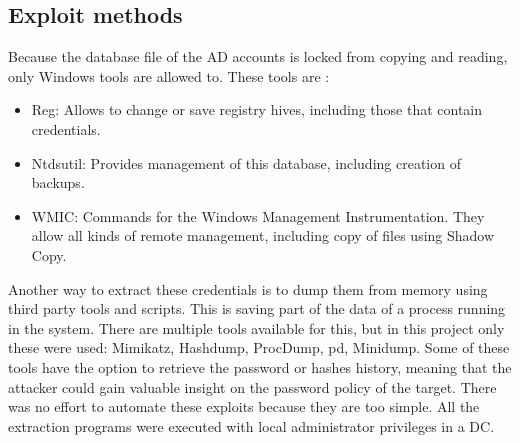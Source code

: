 \subsection{Exploit methods}
Because the database file of the AD accounts is locked from copying and reading, only Windows tools are allowed to. These tools are \cite{dump_ways}:
\begin{itemize}
	\item Reg: Allows to change or save registry hives, including those that contain credentials.
	\item Ntdsutil: Provides management of this database, including creation of backups.
	\item WMIC: Commands for the Windows Management Instrumentation. They allow all kinds of remote management, including copy of files using Shadow Copy.
\end{itemize}
Another way to extract these credentials is to dump them from memory using third party tools and scripts. This is saving part of the data of a process running in the system\cite{dump_ways}.
There are multiple tools available for this, but in this project only these were used: Mimikatz, Hashdump, ProcDump, pd, Minidump.
\linej
Some of these tools have the option to retrieve the password or hashes history, meaning that the attacker could gain valuable insight on the password policy of the target.
\linej
\linej
There was no effort to automate these exploits because they are too simple.
All the extraction programs were executed with local administrator privileges in a DC.


